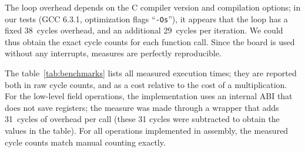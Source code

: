 \documentclass{llncs}
\begin{document}
The loop overhead depends on the C compiler version and compilation
options; in our tests (GCC 6.3.1, optimization flags ``\verb+-Os+''), it
appears that the loop has a fixed 38~cycles overhead, and an additional
29~cycles per iteration. We could thus obtain the exact cycle counts for
each function call. Since the board is used without any interrupts,
measures are perfectly reproducible.

The table~\ref{tab:benchmarks} lists all measured execution times; they
are reported both in raw cycle counts, and as a cost relative to the
cost of a multiplication. For the low-level field operations, the
implementation uses an internal ABI that does not save registers; the
measure was made through a wrapper that adds 31~cycles of overhead per
call (these 31 cycles were subtracted to obtain the values in the
table). For all operations implemented in assembly, the measured cycle
counts match manual counting exactly.
\end{document}
